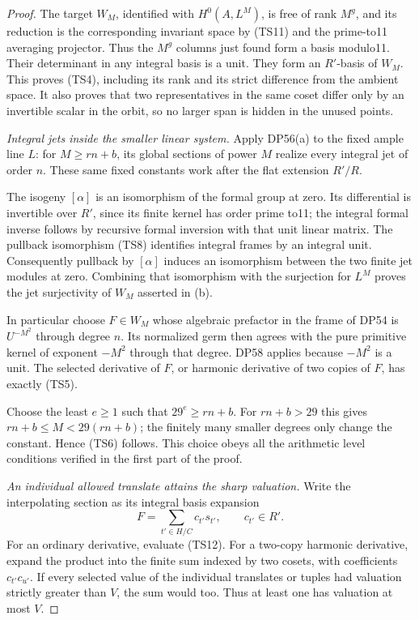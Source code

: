 \begin{proof}
The target \(W_M\), identified with \(H^0(A,L^M)\), is free of rank \(M^g\), and its reduction is the corresponding invariant space by (TS11) and the prime-to11 averaging projector. Thus the \(M^g\) columns just found form a basis modulo11. Their determinant in any integral basis is a unit. They form an \(R'\)-basis of \(W_M\). This proves (TS4), including its rank and its strict difference from the ambient space. It also proves that two representatives in the same coset differ only by an invertible scalar in the orbit, so no larger span is hidden in the unused points.

\emph{Integral jets inside the smaller linear system.}
Apply DP56(a) to the fixed ample line \(L\): for \(M\ge rn+b\), its global sections of power \(M\) realize every integral jet of order \(n\). These same fixed constants work after the flat extension \(R'/R\).

The isogeny \([\alpha]\) is an isomorphism of the formal group at zero. Its differential is invertible over \(R'\), since its finite kernel has order prime to11; the integral formal inverse follows by recursive formal inversion with that unit linear matrix. The pullback isomorphism (TS8) identifies integral frames by an integral unit. Consequently pullback by \([\alpha]\) induces an isomorphism between the two finite jet modules at zero. Combining that isomorphism with the surjection for \(L^M\) proves the jet surjectivity of \(W_M\) asserted in (b).

In particular choose \(F\in W_M\) whose algebraic prefactor in the frame of DP54 is \(U^{-M^2}\) through degree \(n\). Its normalized germ then agrees with the pure primitive kernel of exponent \(-M^2\) through that degree. DP58 applies because \(-M^2\) is a unit. The selected derivative of \(F\), or harmonic derivative of two copies of \(F\), has exactly (TS5).

Choose the least \(e\ge1\) such that \(29^e\ge rn+b\). For \(rn+b>29\) this gives \(rn+b\le M<29(rn+b)\); the finitely many smaller degrees only change the constant. Hence (TS6) follows. This choice obeys all the arithmetic level conditions verified in the first part of the proof.

\emph{An individual allowed translate attains the sharp valuation.}
Write the interpolating section as its integral basis expansion \[
 F=\sum_{t'\in H/C}c_{t'}s_{t'},\qquad c_{t'}\in R'.
 \tag{TS12}
\] For an ordinary derivative, evaluate (TS12). For a two-copy harmonic derivative, expand the product into the finite sum indexed by two cosets, with coefficients \(c_{t'}c_{u'}\). If every selected value of the individual translates or tuples had valuation strictly greater than \(V\), the sum would too. Thus at least one has valuation at most \(V\).


\end{proof}
